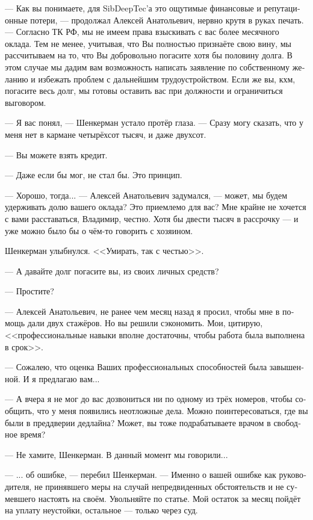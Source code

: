 \documentclass[a5paper,12pt,fleqn]{extbook}\usepackage{cooltooltips}\usepackage{polyglossia}\setdefaultlanguage[babelshorthands=true]{russian}\setotherlanguage{english}\defaultfontfeatures{Ligatures=TeX,Mapping=tex-text} \usepackage{xcolor}\definecolor{lightgray}{HTML}{bbbbbb}\color{lightgray}\newcommand{\ml}[3]{\textenglish{\textcolor{black}{#3}}}
\begin{document}
--- Как вы понимаете, для SibDeepTec'а это ощутимые финансовые и репутационные потери, --- продолжал Алексей Анатольевич, нервно крутя в руках печать.
--- Согласно ТК РФ, мы не имеем права взыскивать с вас более месячного оклада.
Тем не менее, учитывая, что Вы полностью признаёте свою вину, мы рассчитываем на то, что Вы добровольно погасите хотя бы половину долга.
В этом случае мы дадим вам возможность написать заявление по собственному желанию и избежать проблем с дальнейшим трудоустройством.
Если же вы, кхм, погасите весь долг, мы готовы оставить вас при должности и ограничиться выговором.

--- Я вас понял, --- Шенкерман устало протёр глаза.
--- Сразу могу сказать, что у меня нет в кармане четырёхсот тысяч, и даже двухсот.

--- Вы можете взять кредит.

--- Даже если бы мог, не стал бы.
Это принцип.

--- Хорошо, тогда... --- Алексей Анатольевич задумался, --- может, мы будем удерживать долю вашего оклада?
Это приемлемо для вас?
Мне крайне не хочется с вами расставаться, Владимир, честно.
Хотя бы двести тысяч в рассрочку --- и уже можно было бы о чём-то говорить с хозяином.

Шенкерман улыбнулся.
<<Умирать, так с честью>>.

--- А давайте долг погасите вы, из своих личных средств?

--- Простите?

--- Алексей Анатольевич, не ранее чем месяц назад я просил, чтобы мне в помощь дали двух стажёров.
Но вы решили сэкономить.
Мои, цитирую, <<профессиональные навыки вполне достаточны, чтобы работа была выполнена в срок>>.

--- Сожалею, что оценка Ваших профессиональных способностей была завышенной.
И я предлагаю вам...

--- А вчера я не мог до вас дозвониться ни по одному из трёх номеров, чтобы сообщить, что у меня появились неотложные дела.
Можно поинтересоваться, где вы были в преддверии дедлайна?
Может, вы тоже подрабатываете врачом в свободное время?

--- Не хамите, Шенкерман.
В данный момент мы говорили...

--- ... об ошибке, --- перебил Шенкерман.
--- Именно о вашей ошибке как руководителя, не принявшего меры на случай непредвиденных обстоятельств и не сумевшего настоять на своём.
Увольняйте по статье.
Мой остаток за месяц пойдёт на уплату неустойки, остальное --- только через суд.
\end{document}
